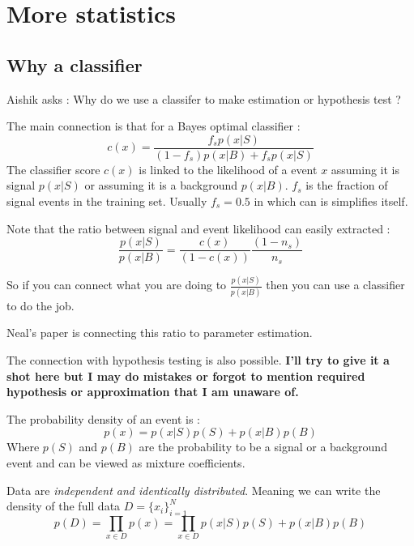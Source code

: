 \section{More statistics} %
\label{sec:more_statistics}



\subsection{Why a classifier} %
\label{sub:why_a_classifier}

Aishik asks : Why do we use a classifer to make estimation or hypothesis test ?

The main connection is that for a Bayes optimal classifier \needcite : 
\begin{equation}
	c(x) = \frac{f_s p(x|S)}{(1-f_s) p(x|B) + f_s p(x|S)}
\end{equation}
The classifier score $c(x)$ is linked to the likelihood of a event $x$ assuming it is signal $ p(x|S)$ or assuming it is a background $p(x|B)$.
$f_s$ is the fraction of signal events in the training set.
Usually $f_s = 0.5$ in which can is simplifies itself.

Note that the ratio between signal and event likelihood can easily extracted :
\begin{equation}
	\frac{p(x|S)}{p(x|B)} = \frac{c(x)}{(1-c(x))} \frac{(1-n_s)}{n_s} 
\end{equation}

So if you can connect what you are doing to $\frac{p(x|S)}{p(x|B)}$ then you can use a classifier to do the job.

Neal's paper \cite{Neal:2007zz} is connecting this ratio to parameter estimation.

The connection with hypothesis testing is also possible.
\textbf{I'll try to give it a shot here but I may do mistakes or forgot to mention required hypothesis or approximation that I am unaware of.}

The probability density of an event is :
\begin{equation}
 	p(x) = p(x|S) p(S) + p(x|B) p(B)
\end{equation} 
Where $p(S)$ and $p(B)$ are the probability to be a signal or a background event and can be viewed as mixture coefficients.

Data are \emph{independent and identically distributed}.
Meaning we can write the density of the full data $D = \{x_i\}_{i=1}^N$
\begin{equation}
	p(D) = \prod_{x\in D} p(x) = \prod_{x\in D} p(x|S) p(S) + p(x|B) p(B)
\end{equation}

